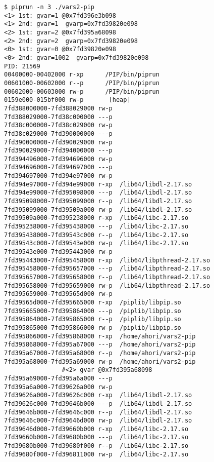 

{\footnotesize
\begin{lstlisting}[style=example,caption={``Vars2 PiP'' output},label=out:vars2-pip]
$ piprun -n 3 ./vars2-pip
<1> 1st: gvar=1 @0x7fd396e3b098
<1> 2nd: gvar=1	 gvarp=0x7fd39820e098
<2> 1st: gvar=2 @0x7fd395a68098
<2> 2nd: gvar=2	 gvarp=0x7fd39820e098
<0> 1st: gvar=0 @0x7fd39820e098
<0> 2nd: gvar=1002  gvarp=0x7fd39820e098
PID: 21569
00400000-00402000 r-xp		/PIP/bin/piprun
00601000-00602000 r--p		/PIP/bin/piprun
00602000-00603000 rw-p		/PIP/bin/piprun
0159e000-015bf000 rw-p		 [heap]
7fd388000000-7fd388029000 rw-p
7fd388029000-7fd38c000000 ---p
7fd38c000000-7fd38c029000 rw-p
7fd38c029000-7fd390000000 ---p
7fd390000000-7fd390029000 rw-p
7fd390029000-7fd394000000 ---p
7fd394496000-7fd394696000 rw-p
7fd394696000-7fd394697000 ---p
7fd394697000-7fd394e97000 rw-p
7fd394e97000-7fd394e99000 r-xp	/lib64/libdl-2.17.so
7fd394e99000-7fd395098000 ---p	/lib64/libdl-2.17.so
7fd395098000-7fd395099000 r--p	/lib64/libdl-2.17.so
7fd395099000-7fd39509a000 rw-p	/lib64/libdl-2.17.so
7fd39509a000-7fd395238000 r-xp	/lib64/libc-2.17.so
7fd395238000-7fd395438000 ---p	/lib64/libc-2.17.so
7fd395438000-7fd39543c000 r--p	/lib64/libc-2.17.so
7fd39543c000-7fd39543e000 rw-p	/lib64/libc-2.17.so
7fd39543e000-7fd395443000 rw-p
7fd395443000-7fd395458000 r-xp	/lib64/libpthread-2.17.so
7fd395458000-7fd395657000 ---p	/lib64/libpthread-2.17.so
7fd395657000-7fd395658000 r--p	/lib64/libpthread-2.17.so
7fd395658000-7fd395659000 rw-p	/lib64/libpthread-2.17.so
7fd395659000-7fd39565d000 rw-p
7fd39565d000-7fd395665000 r-xp	/piplib/libpip.so
7fd395665000-7fd395864000 ---p	/piplib/libpip.so
7fd395864000-7fd395865000 r--p	/piplib/libpip.so
7fd395865000-7fd395866000 rw-p	/piplib/libpip.so
7fd395866000-7fd395868000 r-xp	/home/ahori/vars2-pip
7fd395868000-7fd395a67000 ---p	/home/ahori/vars2-pip
7fd395a67000-7fd395a68000 r--p	/home/ahori/vars2-pip
7fd395a68000-7fd395a69000 rw-p	/home/ahori/vars2-pip
				#<2> gvar @0x7fd395a68098
7fd395a69000-7fd395a6a000 ---p
7fd395a6a000-7fd39626a000 rw-p
7fd39626a000-7fd39626c000 r-xp	/lib64/libdl-2.17.so
7fd39626c000-7fd39646b000 ---p	/lib64/libdl-2.17.so
7fd39646b000-7fd39646c000 r--p	/lib64/libdl-2.17.so
7fd39646c000-7fd39646d000 rw-p	/lib64/libdl-2.17.so
7fd39646d000-7fd39660b000 r-xp	/lib64/libc-2.17.so
7fd39660b000-7fd39680b000 ---p	/lib64/libc-2.17.so
7fd39680b000-7fd39680f000 r--p	/lib64/libc-2.17.so
7fd39680f000-7fd396811000 rw-p	/lib64/libc-2.17.so

\end{lstlisting}}
